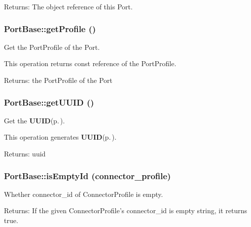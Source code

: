 \begin{Desc}
\item[Returns:]The object reference of this Port.\end{Desc}
\subsubsection{\setlength{\rightskip}{0pt plus 5cm}Port\-Base::get\-Profile ()}\label{classPortBase_PortBasea11}


Get the Port\-Profile of the Port. 

This operation returns const reference of the Port\-Profile.

\begin{Desc}
\item[Returns:]the Port\-Profile of the Port\end{Desc}
\subsubsection{\setlength{\rightskip}{0pt plus 5cm}Port\-Base::get\-UUID ()}\label{classPortBase_PortBasea18}


Get the {\bf UUID}{\rm (p.\,\pageref{classUUID})}. 

This operation generates {\bf UUID}{\rm (p.\,\pageref{classUUID})}.

\begin{Desc}
\item[Returns:]uuid\end{Desc}
\subsubsection{\setlength{\rightskip}{0pt plus 5cm}Port\-Base::is\-Empty\-Id (connector\_\-profile)}\label{classPortBase_PortBasea17}


Whether connector\_\-id of Connector\-Profile is empty. 

\begin{Desc}
\item[Returns:]If the given Connector\-Profile's connector\_\-id is empty string, it returns true.\end{Desc}

